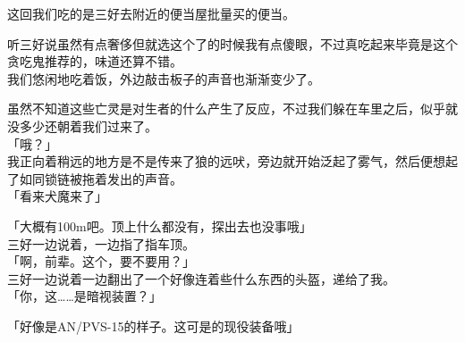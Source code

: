 这回我们吃的是三好去附近的便当屋批量买的便当。

听三好说虽然有点奢侈但就选这个了的时候我有点傻眼，不过真吃起来毕竟是这个贪吃鬼推荐的，味道还算不错。\\

我们悠闲地吃着饭，外边敲击板子的声音也渐渐变少了。

虽然不知道这些亡灵是对生者的什么产生了反应，不过我们躲在车里之后，似乎就没多少还朝着我们过来了。\\

「哦？」\\

我正向着稍远的地方是不是传来了狼的远吠，旁边就开始泛起了雾气，然后便想起了如同锁链被拖着发出的声音。\\

「看来犬魔来了」

「大概有100m吧。顶上什么都没有，探出去也没事哦」\\

三好一边说着，一边指了指车顶。\\

「啊，前辈。这个，要不要用？」\\

三好一边说着一边翻出了一个好像连着些什么东西的头盔，递给了我。\\

「你，这……是暗视装置？」

「好像是AN/PVS-15的样子。这可是的现役装备哦」

